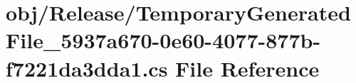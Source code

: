 \hypertarget{_release_2_temporary_generated_file__5937a670-0e60-4077-877b-f7221da3dda1_8cs}{
\section{obj/Release/TemporaryGeneratedFile\_\-5937a670-\/0e60-\/4077-\/877b-\/f7221da3dda1.cs File Reference}
\label{_release_2_temporary_generated_file__5937a670-0e60-4077-877b-f7221da3dda1_8cs}
}
